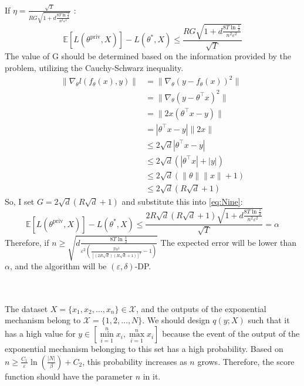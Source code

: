 \documentclass[12pt]{extarticle}
\begin{document}
 If $\eta = \frac{\sqrt{T}}{RG\sqrt{1 + d\frac{8T\ln\frac{1}{\delta}}{n^2\varepsilon^2}}}$ : 
 \begin{equation}
 		\mathbb{E}[L(\theta^\text{priv}, X)] -  L(\theta^{*}, X) \leq \frac{RG\sqrt{1 + d\frac{8T\ln\frac{1}{\delta}}{n^2\varepsilon^2}}}{\sqrt{T}}\label{eq:Nine}
 \end{equation}
The value of G should be determined based on the information provided by the problem, utilizing the Cauchy-Schwarz inequality.
\begin{align*}
	\|\nabla_\theta  l(f_\theta(x), y)\| &=\| \nabla_\theta (y - f_\theta(x))^2\|\\
	& = \|\nabla_\theta (y - \theta^\top x)^2\| \\
	&= \|2x(\theta^\top x -y)\|\\
	&= |\theta^\top x -y| \|2x\|\\
	&\le 2\sqrt{d}|\theta^\top x -y|\\
	&\le 2\sqrt{d}(|\theta^\top x| +|y|)\\
	&\le 2\sqrt{d}(\|\theta\|\|x\| +1)\\
	&\le 2\sqrt{d}(R\sqrt{d} +1)
 \end{align*}
So, I set $G = 2\sqrt{d}(R\sqrt{d} + 1)$ and substitute this into \ref{eq:Nine}:
 \begin{equation}
	\mathbb{E}[L(\theta^\text{priv}, X)] -  L(\theta^{*}, X)
	 \leq \frac{2R\sqrt{d}(R\sqrt{d} + 1)\sqrt{1 + d\frac{8T\ln\frac{1}{\delta}}{n^2\varepsilon^2}}}{\sqrt{T}} = \alpha\label{eq:Ten}
\end{equation}
Therefore, if $n\ge \sqrt{ d\frac{8T\ln\frac{1}{\delta}}{\varepsilon^2(\frac{T\alpha^2}{[(2R\sqrt{d})(R\sqrt{d} + 1)]^{2}}-1)}}$ The expected error will be lower than $\alpha$, and the algorithm will be $(\varepsilon, \delta)$-DP.
\\\\	\\ The dataset \(X = \{x_1, x_2, \ldots, x_n\} \in \mathcal{X}\), and the outputs of the exponential mechanism belong to \(\mathcal{X} = \{1, 2, \ldots, N\}\). We should design \(q(y;X)\) such that it has a high value for \(y \in [\underset{i=1}{\overset{n}{\min}} x_i, \underset{i=1}{\overset{n}{\max}} x_i]\) because the event of the output of the exponential mechanism belonging to this set has a high probability. Based on \(n \geq \frac{C_1}{\varepsilon} \ln\left(\frac{|N|}{\beta}\right) + C_2\), this probability increases as \(n\) grows. Therefore, the score function should have the parameter \(n\) in it.\\
\end{document}
